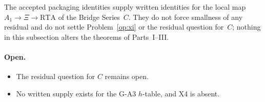 \begin{remark}
The accepted packaging identities supply written identities for the local map $A_1\to\Xi\to\mathrm{RTA}$ of the Bridge Series~$C$. They do not force smallness of any residual and do not settle Problem~\ref{op:xi} or the residual question for~$C$; nothing in this subsection alters the theorems of Parts~I--III.
\end{remark}

\paragraph{Open.}
\begin{itemize}
\item The residual question for $C$ remains open.
\item No written supply exists for the G-A3 $h$-table, and X4 is absent.
\end{itemize}
